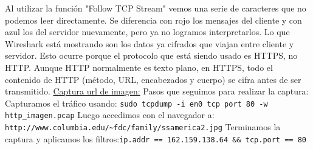 \documentclass[12pt]{article} %
\begin{document}
Al utilizar la función "Follow TCP Stream" vemos una serie de caracteres que no podemos leer directamente. Se diferencia con rojo los mensajes del cliente y con azul los del servidor nuevamente, pero ya no logramos interpretarlos. Lo que Wireshark está mostrando son los datos ya cifrados que viajan entre cliente y servidor.
\newline
\newline
Esto ocurre porque el protocolo que está siendo usado es HTTPS, no HTTP. Aunque HTTP normalmente es texto plano, en HTTPS, todo el contenido de HTTP (método, URL, encabezados y cuerpo) se cifra antes de ser transmitido.
\newline
\newline
\underline {Captura url de imagen:}
\newline
\newline
Pasos que seguimos para realizar la captura:
\newline
Capturamos el tráfico usando: \verb|sudo tcpdump -i en0 tcp port 80 -w http_imagen.pcap|
\newline
Luego accedimos con el navegador a: \verb|http://www.columbia.edu/~fdc/family/ssamerica2.jpg|
\newline
Terminamos la captura y aplicamos los filtros:\verb|ip.addr == 162.159.138.64 && tcp.port == 80|
\newline
\end{document}
